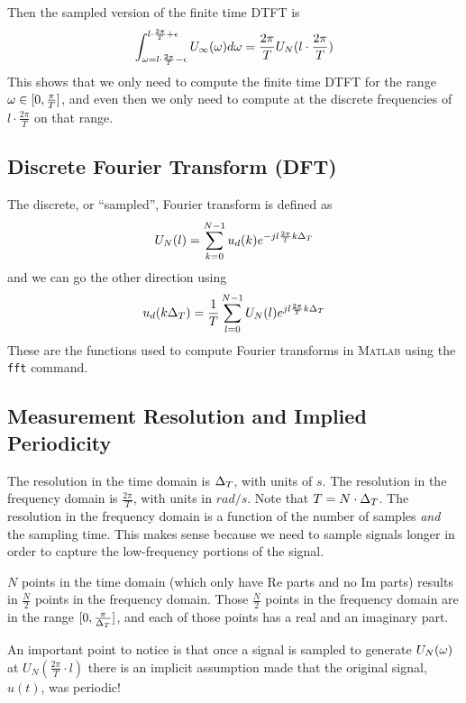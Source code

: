 Then the sampled version of the finite time DTFT is
$$\int_{\omega=l\cdot \frac{2\pi}{T}-\epsilon}^{l\cdot \frac{2\pi}{T}+\epsilon} U_\infty(\omega)d\omega
= \frac{2\pi}{T}U_N(l\cdot \frac{2\pi}{T})$$
This shows that we only need to compute the finite time DTFT for the range $\omega\in[0,\frac{\pi}{T}]$, and even then we only need to compute at the discrete frequencies of $l\cdot\frac{2\pi}{T}$ on that range.

\subsection{Discrete Fourier Transform (DFT)}
The discrete, or ``sampled'', Fourier transform is defined as
$$U_N(l) = \sum_{k=0}^{N-1} u_d(k) e^{-jl\frac{2\pi}{T}k\Delta_T}$$
and we can go the other direction using
$$u_d(k\Delta_T) = \frac{1}{T} \sum_{l=0}^{N-1} U_N(l) e^{jl\frac{2\pi}{T}k\Delta_T}$$
These are the functions used to compute Fourier transforms in \textsc{Matlab} using the \texttt{fft} command.

\subsection{Measurement Resolution and Implied Periodicity}
\label{sec:impliedperiodicity}
The resolution in the time domain is $\Delta_T$, with units of $s$.
The resolution in the frequency domain is $\frac{2\pi}{T}$, with units in $rad/s$.
Note that $T=N\cdot\Delta_T$.
The resolution in the frequency domain is a function of the number of samples \textit{and} the sampling time.
This makes sense because  we need to sample signals longer in order to capture the low-frequency portions of the signal.

$N$ points in the time domain (which only have $\text{Re}$ parts and no $\text{Im}$ parts) results in $\frac{N}{2}$ points in the frequency domain.
Those $\frac{N}{2}$ points in the frequency domain are in the range $[0,\frac{\pi}{\Delta_T}]$, and each of those points has a real and an imaginary part.

An important point to notice is that once a signal is sampled to generate $U_N(\omega)$ at $U_N(\frac{2\pi}{T}\cdot l)$ there is an implicit assumption made that the original signal, $u(t)$, was periodic!
